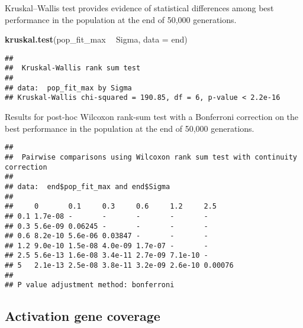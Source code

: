 \documentclass[]{book}
\newenvironment{Shaded}{\begin{snugshade}}{\end{snugshade}}
\newcommand{\DataTypeTok}[1]{\textcolor[rgb]{0.13,0.29,0.53}{#1}}
\newcommand{\KeywordTok}[1]{\textcolor[rgb]{0.13,0.29,0.53}{\textbf{#1}}}
\newcommand{\NormalTok}[1]{#1}
\newcommand{\OperatorTok}[1]{\textcolor[rgb]{0.81,0.36,0.00}{\textbf{#1}}}
\newcommand{\OtherTok}[1]{\textcolor[rgb]{0.56,0.35,0.01}{#1}}
\newcommand{\StringTok}[1]{\textcolor[rgb]{0.31,0.60,0.02}{#1}}
\begin{document}
Kruskal--Wallis test provides evidence of statistical differences among best performance in the population at the end of 50,000 generations.

\begin{Shaded}
\begin{Highlighting}[]
\KeywordTok{kruskal.test}\NormalTok{(pop_fit_max }\OperatorTok{~}\StringTok{ }\NormalTok{Sigma, }\DataTypeTok{data =}\NormalTok{ end)}
\end{Highlighting}
\end{Shaded}

\begin{verbatim}
## 
##  Kruskal-Wallis rank sum test
## 
## data:  pop_fit_max by Sigma
## Kruskal-Wallis chi-squared = 190.85, df = 6, p-value < 2.2e-16
\end{verbatim}

Results for post-hoc Wilcoxon rank-sum test with a Bonferroni correction on the best performance in the population at the end of 50,000 generations.

\begin{Shaded}
\end{Shaded}

\begin{verbatim}
## 
##  Pairwise comparisons using Wilcoxon rank sum test with continuity correction 
## 
## data:  end$pop_fit_max and end$Sigma 
## 
##     0       0.1     0.3     0.6     1.2     2.5    
## 0.1 1.7e-08 -       -       -       -       -      
## 0.3 5.6e-09 0.06245 -       -       -       -      
## 0.6 8.2e-10 5.6e-06 0.03847 -       -       -      
## 1.2 9.0e-10 1.5e-08 4.0e-09 1.7e-07 -       -      
## 2.5 5.6e-13 1.6e-08 3.4e-11 2.7e-09 7.1e-10 -      
## 5   2.1e-13 2.5e-08 3.8e-11 3.2e-09 2.6e-10 0.00076
## 
## P value adjustment method: bonferroni
\end{verbatim}

\hypertarget{activation-gene-coverage-7}{%
\subsection{Activation gene coverage}\label{activation-gene-coverage-7}}
\end{document}
